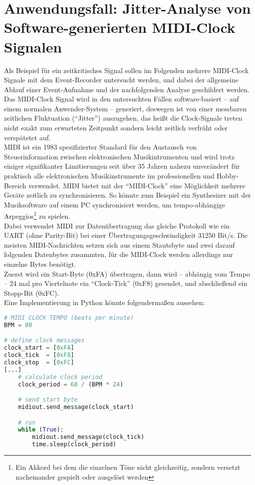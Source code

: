 \chapter{Anwendungsfall: Jitter-Analyse von Software-generierten MIDI-Clock Signalen}
\label{ch:Anwendungsfall}
Als Beispiel für ein zeitkritisches Signal sollen im Folgenden mehrere MIDI-Clock Signale mit dem Event-Recorder untersucht werden, und dabei der allgemeine Ablauf einer Event-Aufnahme und der nachfolgenden Analyse geschildert werden.
Das MIDI-Clock Signal wird in den untersuchten Fällen software-basiert -- auf einem normalen Anwender-System -- generiert, deswegen ist von einer messbaren zeitlichen Fluktuation (``Jitter'') auszugehen, das heißt die Clock-Signale treten nicht exakt zum erwarteten Zeitpunkt sondern leicht zeitlich verfrüht oder verspätetet auf.\\
\acrshort{MIDI} ist ein 1983 spezifizierter Standard für den Austausch von Steuerinformation zwischen elektronischen Musikintrumenten und wird trotz einiger signifikanter Limitierungen seit über 35 Jahren nahezu unverändert für praktisch alle elektronischen Musikinstrumente im professionellen und Hobby-Bereich verwendet. 
MIDI bietet mit der ``MIDI-Clock'' eine Möglichkeit mehrere Geräte zeitlich zu synchronisieren. So könnte zum Beispiel ein Synthesizer mit der Musiksoftware auf einem PC synchronisiert werden, um tempo-abhängige Arpeggios\footnote{Ein Akkord bei dem die einzelnen Töne nicht gleichzeitig, sondern versetzt nacheinander gespielt oder ausgelöst werden} zu spielen.\\
Dabei verwendet MIDI zur Datenübertragung das gleiche Protokoll wie ein \acrshort{UART} (ohne Parity-Bit) bei einer Übertragungsgeschwindigkeit 31250 Bit/s. Die meisten MIDI-Nachrichten setzen sich aus einem Stautsbyte und zwei darauf folgenden Datenbytes zusammten, für die MIDI-Clock werden allerdings nur einzelne Bytes benötigt. \\
Zuerst wird ein Start-Byte (0xFA) übertragen, dann wird -- abhängig vom Tempo -- 24 mal pro Viertelnote ein ``Clock-Tick'' (0xF8) gesendet, und abschließend ein Stopp-Bit (0xFC). \\     
Eine Implementierung in Python könnte folgendermaßen aussehen:
\begin{lstlisting}[language=python]
# MIDI CLOCK TEMPO (beats per minute)
BPM = 80

# define clock messages
clock_start = [0xFA]
clock_tick  = [0xF8]
clock_stop  = [0xFC]
[...]
    # calculate clock period
    clock_period = 60 / (BPM * 24)

    # send start byte 
    midiout.send_message(clock_start)

    # run
    while (True):
        midiout.send_message(clock_tick)
        time.sleep(clock_period)

\end{lstlisting}

